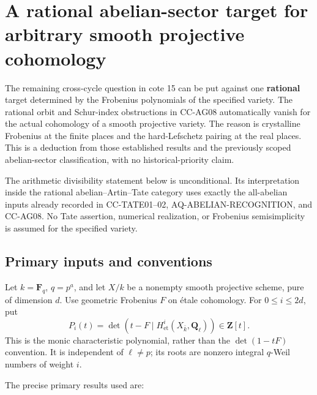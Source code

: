 \section{A rational abelian-sector target for arbitrary smooth
projective
cohomology}\label{a-rational-abelian-sector-target-for-arbitrary-smooth-projective-cohomology}

The remaining cross-cycle question in cote 15 can be put against one
\textbf{rational} target determined by the Frobenius polynomials of the
specified variety. The rational orbit and Schur-index obstructions in
CC-AG08 automatically vanish for the actual cohomology of a smooth
projective variety. The reason is crystalline Frobenius at the finite
places and the hard-Lefschetz pairing at the real places. This is a
deduction from those established results and the previously scoped
abelian-sector classification, with no historical-priority claim.

The arithmetic divisibility statement below is unconditional. Its
interpretation inside the rational abelian--Artin--Tate category uses
exactly the all-abelian inputs already recorded in CC-TATE01--02,
AQ-ABELIAN-RECOGNITION, and CC-AG08. No Tate assertion, numerical
realization, or Frobenius semisimplicity is assumed for the specified
variety.

\subsection{Primary inputs and
conventions}\label{primary-inputs-and-conventions}

Let \(k=\mathbf F_q\), \(q=p^a\), and let \(X/k\) be a nonempty smooth
projective scheme, pure of dimension \(d\). Use geometric Frobenius
\(F\) on étale cohomology. For \(0\leq i\leq 2d\), put \[
 P_i(t)=\det(t-F\mid H^i_{\mathrm{et}}
                  (X_{\bar k},\mathbf Q_\ell))\in\mathbf Z[t].
                                                        \tag{CC-XC.R11}
\] This is the monic characteristic polynomial, rather than the
\(\det(1-tF)\) convention. It is independent of \(\ell\ne p\); its roots
are nonzero integral \(q\)-Weil numbers of weight \(i\).

The precise primary results used are:

